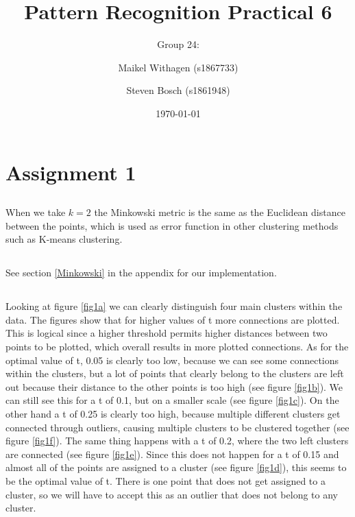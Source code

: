 \documentclass[10pt]{article}
\title{Pattern Recognition Practical 6}
\author{Group 24: \and Maikel Withagen (s1867733) \and Steven Bosch (s1861948)}
\date{\today}
\begin{document}
\maketitle

\section*{Assignment 1}
\subsection{}
When we take $k=2$ the Minkowski metric is the same as the Euclidean distance between the points, which is used as error function in other clustering methods such as K-means clustering.

\subsection{}
See section \ref{Minkowski} in the appendix for our implementation.

\subsection{}
Looking at figure \ref{fig1a} we can clearly distinguish four main clusters within the data. The figures show that for higher values of t more connections are plotted. This is logical since a higher threshold permits higher distances between two points to be plotted, which overall results in more plotted connections. As for the optimal value of t, 0.05 is clearly too low, because we can see some connections within the clusters, but a lot of points that clearly belong to the clusters are left out because their distance to the other points is too high (see figure \ref{fig1b}). We can still see this for a t of 0.1, but on a smaller scale (see figure \ref{fig1c}). On the other hand a t of 0.25 is clearly too high, because multiple different clusters get connected through outliers, causing multiple clusters to be clustered together (see figure \ref{fig1f}). The same thing happens with a t of 0.2, where the two left clusters are connected (see figure \ref{fig1e}). Since this does not happen for a t of 0.15 and almost all of the points are assigned to a cluster (see figure \ref{fig1d}), this seems to be the optimal value of t. There is one point that does not get assigned to a cluster, so we will have to accept this as an outlier that does not belong to any cluster. 
\end{document}
